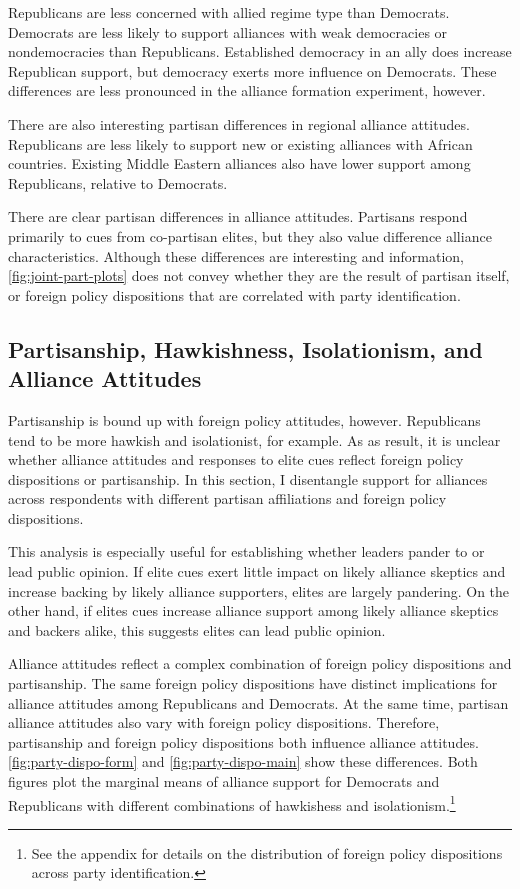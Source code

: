 \documentclass[12pt]{article}
\begin{document}
Republicans are less concerned with allied regime type than Democrats.  
Democrats are less likely to support alliances with weak democracies or nondemocracies than Republicans.
Established democracy in an ally does increase Republican support, but democracy exerts more influence on Democrats. 
These differences are less pronounced in the alliance formation experiment, however. 


There are also interesting partisan differences in regional alliance attitudes.
Republicans are less likely to support new or existing alliances with African countries. 
Existing Middle Eastern alliances also have lower support among Republicans, relative to Democrats.


There are clear partisan differences in alliance attitudes. 
Partisans respond primarily to cues from co-partisan elites, but they also value difference alliance characteristics. 
Although these differences are interesting and information, \autoref{fig:joint-part-plots} does not convey whether they are the result of partisan itself, or foreign policy dispositions that are correlated with party identification. 


\subsection{Partisanship, Hawkishness, Isolationism, and Alliance Attitudes}


Partisanship is bound up with foreign policy attitudes, however. 
Republicans tend to be more hawkish and isolationist, for example.
As as result, it is unclear whether alliance attitudes and responses to elite cues reflect foreign policy dispositions or partisanship. 
In this section, I disentangle support for alliances across respondents with different partisan affiliations and foreign policy dispositions.  


This analysis is especially useful for establishing whether leaders pander to or lead public opinion. 
If elite cues exert little impact on likely alliance skeptics and increase backing by likely alliance supporters, elites are largely pandering. 
On the other hand, if elites cues increase alliance support among likely alliance skeptics and backers alike, this suggests elites can lead public opinion. 


Alliance attitudes reflect a complex combination of foreign policy dispositions and partisanship. 
The same foreign policy dispositions have distinct implications for alliance attitudes among Republicans and Democrats.
At the same time, partisan alliance attitudes also vary with foreign policy dispositions. 
Therefore, partisanship and foreign policy dispositions both influence alliance attitudes. 
\autoref{fig:party-dispo-form} and \autoref{fig:party-dispo-main} show these differences. 
Both figures plot the marginal means of alliance support for Democrats and Republicans with different combinations of hawkishess and isolationism.\footnote{See the appendix for details on the distribution of foreign policy dispositions across party identification.} 
\end{document}
